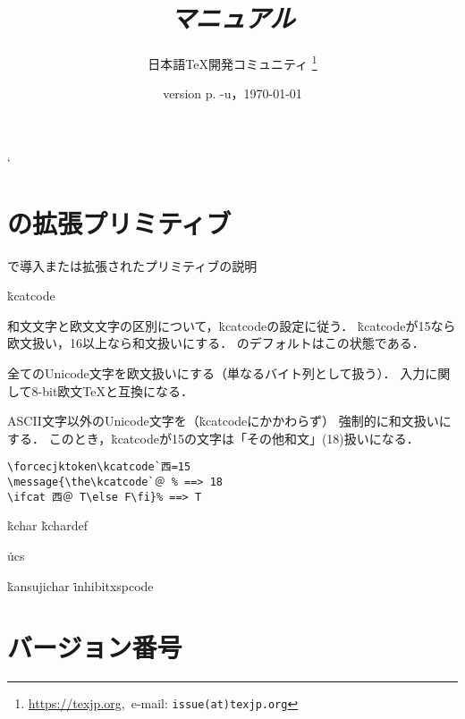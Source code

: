 \documentclass[uplatex,a4paper,11pt,nomag]{jsarticle}
\begin{document}
\catcode`
\title{\emph{\upTeX マニュアル}}
\author{日本語\TeX 開発コミュニティ\null
\thanks{\url{https://texjp.org},\ e-mail: \texttt{issue(at)texjp.org}}}
\date{version p\the\ptexversion.\the\ptexminorversion\ptexrevision
             -u\the\uptexversion\uptexrevision，\today}
\maketitle

\tableofcontents

\newpage

\section{\upTeX の拡張プリミティブ}

\upTeX で導入または拡張されたプリミティブの説明

\.{kcatcode}%

\begin{cslist}
 \csitem[\.{enablecjktoken}]
  和文文字と欧文文字の区別について，\.{kcatcode}の設定に従う．
  \.{kcatcode}が15なら欧文扱い，16以上なら和文扱いにする．
  \upTeX のデフォルトはこの状態である．

 \csitem[\.{disablecjktoken}]
  全てのUnicode文字を欧文扱いにする（単なるバイト列として扱う）．
  入力に関して8-bit欧文\TeX と互換になる．

 \csitem[\.{forcecjktoken}]
  ASCII文字以外のUnicode文字を（\.{kcatcode}にかかわらず）
  強制的に和文扱いにする．
  このとき，\.{kcatcode}が15の文字は「その他和文」(18)扱いになる．
\begin{verbatim}
\forcecjktoken\kcatcode`西=15
\message{\the\kcatcode`＠ % ==> 18
\ifcat 西＠ T\else F\fi}% ==> T
\end{verbatim}
\end{cslist}



\.{kchar}
\.{kchardef}

\.{ucs}

\.{kansujichar}
\.{inhibitxspcode}

\section{バージョン番号}
\end{document}
